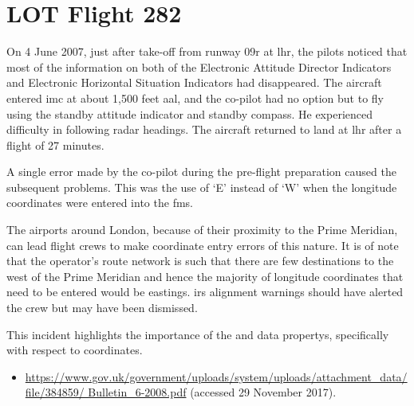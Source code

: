 \section{LOT Flight 282} \label{bkm:incacc:lot282}
On 4 June 2007, just after take-off from runway 09r at \gls{lhr}, the pilots noticed that most of the \gls{information} on both of the Electronic Attitude Director Indicators and Electronic Horizontal Situation Indicators had disappeared. The aircraft entered \gls{imc} at about 1,500 feet \gls{aal}, and the co-pilot had no option but to fly using the standby attitude indicator and standby compass. He experienced difficulty in following radar headings. The aircraft returned to land at \gls{lhr} after a flight of 27 minutes.

A single error made by the co-pilot during the pre-flight preparation caused the subsequent problems. This was the use of `E' instead of `W' when the longitude coordinates were entered into the \gls{fms}.

The airports around London, because of their proximity to the Prime Meridian, can lead flight crews to make coordinate entry errors of this nature. It is of note that the operator's route network is such that there are few destinations to the west of the Prime Meridian and hence the majority of longitude coordinates that need to be entered would be eastings. \gls{irs} alignment warnings should have alerted the crew but may have been dismissed.

This incident highlights the importance of the  and  \glspl{data property}, specifically with respect to coordinates.

\begin{samepage}
\begin{itemize}
  \item \raggedright{\href{https://www.gov.uk/government/uploads/system/uploads/attachment_data/file/384859/Bulletin_6-2008.pdf}{https://www.gov.uk/government/uploads/system/uploads/attachment\_data/file/384859/ Bulletin\_6-2008.pdf} (accessed 29 November 2017).}
\end{itemize}
\end{samepage}

